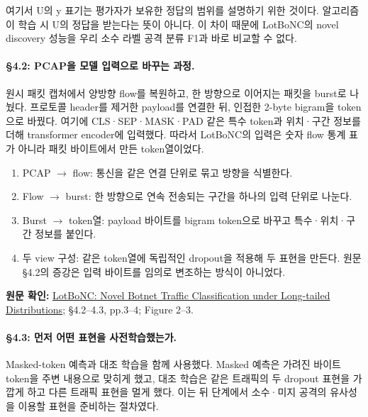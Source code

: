 여기서 U의 y 표기는 평가자가 보유한 정답의 범위를 설명하기 위한 것이다. 알고리즘이 학습 시 U의 정답을 받는다는 뜻이 아니다. 이 차이 때문에 LotBoNC의 novel discovery 성능을 우리 소수 라벨 공격 분류 F1과 바로 비교할 수 없다.


\paragraph{§4.2: PCAP을 모델 입력으로 바꾸는 과정.} 원시 패킷 캡처에서 양방향 flow를 복원하고, 한 방향으로 이어지는 패킷을 burst로 나눴다. 프로토콜 header를 제거한 payload를 연결한 뒤, 인접한 2-byte bigram을 token으로 바꿨다. 여기에 CLS·SEP·MASK·PAD 같은 특수 token과 위치·구간 정보를 더해 transformer encoder에 입력했다. 따라서 LotBoNC의 입력은 숫자 flow 통계 표가 아니라 패킷 바이트에서 만든 token열이었다.


\begin{enumerate}[leftmargin=*,itemsep=3pt]

\item PCAP  \ensuremath{\rightarrow}  flow: 통신을 같은 연결 단위로 묶고 방향을 식별한다.

\item Flow  \ensuremath{\rightarrow}  burst: 한 방향으로 연속 전송되는 구간을 하나의 입력 단위로 나눈다.

\item Burst  \ensuremath{\rightarrow}  token열: payload 바이트를 bigram token으로 바꾸고 특수·위치·구간 정보를 붙인다.

\item 두 view 구성: 같은 token열에 독립적인 dropout을 적용해 두 표현을 만든다. 원문 §4.2의 증강은 입력 바이트를 임의로 변조하는 방식이 아니었다.

\end{enumerate}

{\small\textbf{원문 확인:} \href{https://doi.org/10.1145/3779208.3785276}{LotBoNC: Novel Botnet Traffic Classification under Long-tailed Distributions}; §4.2–4.3, pp.3–4; Figure 2–3.}\par

\paragraph{§4.3: 먼저 어떤 표현을 사전학습했는가.} Masked-token 예측과 대조 학습을 함께 사용했다. Masked 예측은 가려진 바이트 token을 주변 내용으로 맞히게 했고, 대조 학습은 같은 트래픽의 두 dropout 표현을 가깝게 하고 다른 트래픽 표현을 멀게 했다. 이는 뒤 단계에서 소수·미지 공격의 유사성을 이용할 표현을 준비하는 절차였다.



